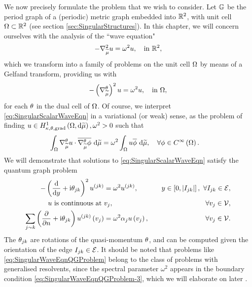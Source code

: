 We now precisely formulate the problem that we wish to consider.
Let $\mathbb{G}$ be the period graph of a (periodic) metric graph embedded into $\mathbb{R}^2$, with unit cell $\Omega\subset\mathbb{R}^2$ (see section \ref{sec:SingularStructures}).
In this chapter, we will concern ourselves with the analysis of the ``wave equation"
\begin{align} \label{eq:SingularScalarWaveEqnWholeSpace}
	-\nabla_{\widetilde{\mu}}^2 u = \omega^2 u, \quad\text{in } \mathbb{R}^2,
\end{align}
which we transform into a family of problems on the unit cell $\Omega$ by means of a Gelfand transform, providing us with
\begin{align} \label{eq:SingularScalarWaveEqn}
	-\left( \nabla^{\theta}_{\widetilde{\mu}} \right)^2 u = \omega^2 u, \quad\text{in } \Omega,
\end{align}
for each $\theta$ in the dual cell of $\Omega$.
Of course, we interpret \eqref{eq:SingularScalarWaveEqn} in a variational (or weak) sense, as the problem of finding $u\in H^1_{\kappa,\theta,\mathrm{grad}}\left( \Omega, \mathrm{d}\widetilde{\mu} \right), \omega^2>0$ such that
\begin{align*}
	\int_{\Omega} \nabla^{\theta}_{\widetilde{\mu}}u\cdot\overline{\nabla^{\theta}_{\widetilde{\mu}}\phi}  \ \mathrm{d}\widetilde{\mu} 
	&= \omega^2\int_{\Omega} u\overline{\phi}  \ \mathrm{d}\widetilde{\mu}, \quad\forall\phi\in C^{\infty}\left( \Omega \right).
\end{align*}
We will demonstrate that solutions to \eqref{eq:SingularScalarWaveEqn} satisfy the quantum graph problem
\begin{subequations} \label{eq:SingularWaveEqnQGProblem}
	\begin{align}
		-\left( \dfrac{\mathrm{d}}{\mathrm{d}y} + \mathrm{i}\theta_{jk} \right)^2 u^{(jk)} &= \omega^2 u^{(jk)}, \quad &y\in\left[ 0,\left\lvert I_{jk} \right\rvert \right], \ \forall I_{jk}\in\mathcal{E}, \label{eq:SingularWaveEqnQGProblem-1} \\
		u \text{ is continuous at } & v_j, \quad &\forall v_j\in\mathcal{V}, \label{eq:SingularWaveEqnQGProblem-2} \\
		\sum_{j\sim k}\left( \dfrac{\partial }{\partial n} + \mathrm{i}\theta_{jk} \right)u^{(jk)}\left( v_j \right) &= \omega^2\alpha_j u\left( v_j \right), \quad &\forall v_j\in\mathcal{V}. \label{eq:SingularWaveEqnQGProblem-3}
	\end{align}
\end{subequations}
The $\theta_{jk}$ are rotations of the quasi-momentum $\theta$, and can be computed given the orientation of the edge $I_{jk}\in\mathcal{E}$.
It should be noted that problems like \eqref{eq:SingularWaveEqnQGProblem} belong to the class of problems with generalised resolvents, since the spectral parameter $\omega^2$ appears in the boundary condition \eqref{eq:SingularWaveEqnQGProblem-3}, which we will elaborate on later .
